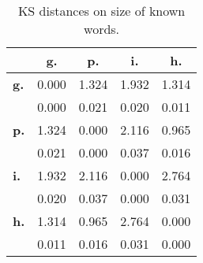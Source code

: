 \begin{table}[h!]
\begin{center}
\begin{tabular}{| l || c | c | c | c |}\hline
 & {\bf g.} & {\bf p.} & {\bf i.} & {\bf h.} \\\hline\hline
{\bf g.} & 0.000 & 1.324 & 1.932 & 1.314 \\
{\bf } & 0.000 & 0.021 & 0.020 & 0.011 \\\hline
{\bf p.} & 1.324 & 0.000 & 2.116 & 0.965 \\
{\bf } & 0.021 & 0.000 & 0.037 & 0.016 \\\hline
{\bf i.} & 1.932 & 2.116 & 0.000 & 2.764 \\
{\bf } & 0.020 & 0.037 & 0.000 & 0.031 \\\hline
{\bf h.} & 1.314 & 0.965 & 2.764 & 0.000 \\
{\bf } & 0.011 & 0.016 & 0.031 & 0.000 \\\hline
\end{tabular}
\caption{KS distances on size of known words.}
\end{center}
\end{table}